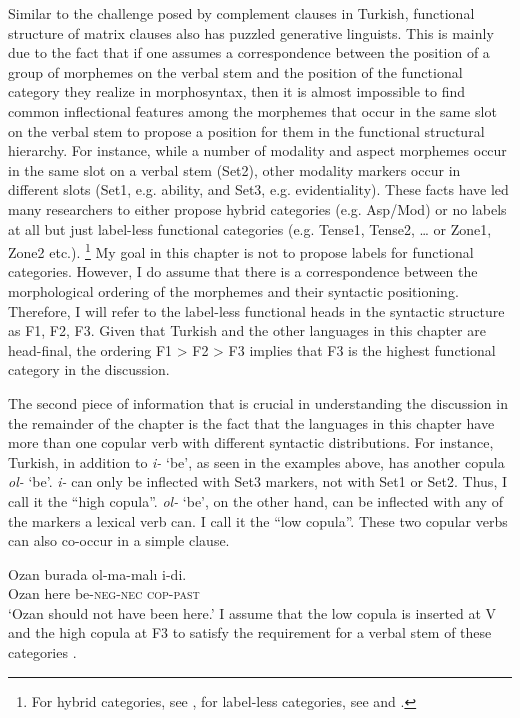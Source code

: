 \documentclass[output=paper]{langsci/langscibook}
\begin{document}
Similar to the challenge posed by complement clauses in Turkish, functional structure of matrix clauses also has puzzled generative linguists. 
This is mainly due to the fact that if one assumes a correspondence between the position of a group of morphemes on the verbal stem 
and the position of the functional category they realize in morphosyntax, then it is almost impossible to find common inflectional features 
among the morphemes that occur in the same slot on the verbal stem to propose a position for them in the functional structural hierarchy. 
For instance, while a number of modality and aspect morphemes occur in the same slot on a verbal stem (Set2), 
other modality markers occur in different slots (Set1, e.g. ability, and Set3, e.g. evidentiality). 
These facts have led many researchers to either propose hybrid categories (e.g. Asp/Mod) or no labels at all 
but just label-less functional categories (e.g. Tense1, Tense2, \ldots{} or Zone1, Zone2 etc.).%
\footnote{
    For hybrid categories, see \citet{AygenTosun1998}, for label-less categories, see \citet{Sezer2001} and \citet{Enc2004}.
} 
My goal in this chapter is not to propose labels for functional categories. 
However, I do assume that there is a correspondence between the morphological ordering of the morphemes and their syntactic positioning. 
Therefore, I will refer to the label-less functional heads in the syntactic structure as F1, F2, F3. 
Given that Turkish and the other languages in this chapter are head-final, 
the ordering F1 > F2 > F3 implies that F3 is the highest functional category in the discussion. 

The second piece of information that is crucial in understanding the discussion in the remainder of the chapter 
is the fact that the languages in this chapter have more than one copular verb with different syntactic distributions. 
For instance, Turkish, in addition to \textit{i-} `be', as seen in the examples above, has another copula  \textit{ol-} `be'. 
\textit{i-} can only be inflected with Set3 markers, not with Set1 or Set2. 
Thus, I call it the ``high copula''. \textit{ol-} `be', on the other hand, can be inflected with any of the markers a lexical verb can. 
I call it the ``low copula''. These two copular verbs can also co-occur in a simple clause.

\ea%
    \label{kelepirex:key:6}
    \gll Ozan burada ol-ma-malı i-di.\\
    Ozan here be-\textsc{neg}{}-\textsc{nec} \textsc{cop}{}-\textsc{past}\\
    \glt `Ozan should not have been here.'
    \z
I assume that the low copula is inserted at V and the high copula at F3 to satisfy the requirement for a verbal stem of these categories 
\citep{Kelepir2001,Enc2004}.
\end{document}

